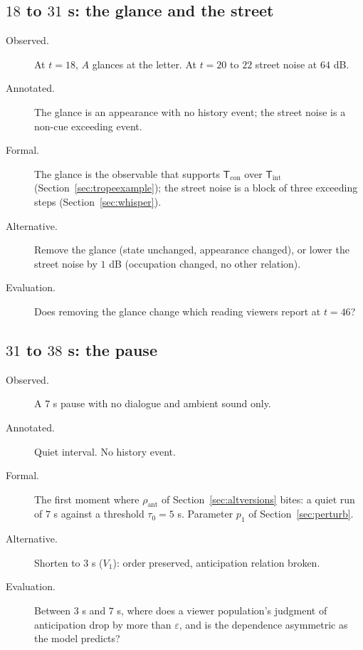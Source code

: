 \subsection*{$18$ to $31$ s: the glance and the street}
\begin{description}
\item[Observed.] At $t=18$, $A$ glances at the letter. At $t=20$ to $22$ street noise at $64$ dB.
\item[Annotated.] The glance is an appearance with no history event; the street noise is a non-cue exceeding event.
\item[Formal.] The glance is the observable that supports $\mathsf{T}_{\mathrm{con}}$ over $\mathsf{T}_{\mathrm{int}}$ (Section~\ref{sec:tropeexample}); the street noise is a block of three exceeding steps (Section~\ref{sec:whisper}).
\item[Alternative.] Remove the glance (state unchanged, appearance changed), or lower the street noise by $1$ dB (occupation changed, no other relation).
\item[Evaluation.] Does removing the glance change which reading viewers report at $t=46$?
\end{description}

\subsection*{$31$ to $38$ s: the pause}
\begin{description}
\item[Observed.] A $7$ s pause with no dialogue and ambient sound only.
\item[Annotated.] Quiet interval. No history event.
\item[Formal.] The first moment where $\rho_{\mathrm{ant}}$ of Section~\ref{sec:altversions} bites: a quiet run of $7$ s against a threshold $\tau_0=5$ s. Parameter $p_1$ of Section~\ref{sec:perturb}.
\item[Alternative.] Shorten to $3$ s ($V_1$): order preserved, anticipation relation broken.
\item[Evaluation.] Between $3$ s and $7$ s, where does a viewer population's judgment of anticipation drop by more than $\varepsilon$, and is the dependence asymmetric as the model predicts?
\end{description}

